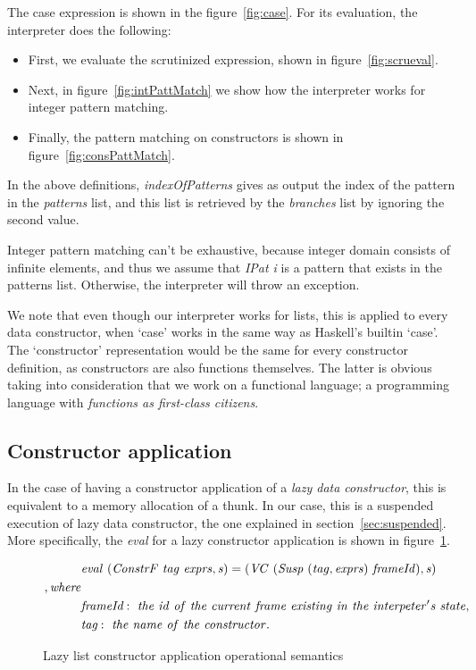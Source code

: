 \documentclass[diploma]{softlab-thesis}
\begin{document}
The case expression is shown in the figure~\ref{fig:case}. For its evaluation, the interpreter 
does the following:~
\begin{itemize}
  \item First, we evaluate the scrutinized expression, shown in figure~\ref{fig:scrueval}.
  \item Next, in figure~\ref{fig:intPattMatch} we show how the interpreter works for 
        integer pattern matching.
  \item Finally, the pattern matching on constructors is shown in figure~\ref{fig:consPattMatch}.
\end{itemize}


In the above definitions, \textit{indexOfPatterns} gives as output the index of the pattern 
in the \textit{patterns} list, and this list is retrieved by the \textit{branches} list 
by ignoring the second value.

Integer pattern matching can't be exhaustive, because integer domain consists of infinite elements, and thus we 
assume that \textit{IPat i} is a pattern that exists in the patterns list. Otherwise, the interpreter will throw an exception.


We note that even though our interpreter works for lists, this is applied to every data constructor, 
when `case' works in the same way as Haskell's builtin `case'. The `constructor' representation 
would be the same for every constructor definition, as constructors are also functions themselves. 
The latter is obvious taking into consideration that we work on a functional language; 
a programming language with \textit{functions as first-class citizens}.

\subsection{Constructor application}

In the case of having a constructor application of a \textit{lazy data constructor},
this is equivalent to a memory allocation of a thunk. In our case, this is 
a suspended execution of lazy data constructor, the one explained in section~\ref{sec:suspended}.
More specifically, the \textit{eval} for a lazy constructor application 
is shown in figure~\ref{fig:consAppl}.

\begin{figure}[h]
  \begin{align*}
    & \mathit{eval \hfill\ (ConstrF \hfill\ tag \hfill\ exprs, s) = (VC \hfill\ (Susp \hfill\ (tag, exprs) \hfill\ frameId), s)} \\
    \mathit{, where} \\
    &  \mathit{\textit{frameId}: \hfill\ the \hfill\ id \hfill\ of \hfill\ the 
    \hfill\ current \hfill\ frame \hfill\ existing \hfill\ in \hfill\ the \hfill\ interpeter's 
    \hfill\ state,} \\
    &  \mathit{\textit{tag}: \hfill\ the \hfill\ name \hfill\ of \hfill\ the \hfill\ 
    constructor.}
  \end{align*}
\caption{Lazy list constructor application operational semantics\label{fig:consAppl}}
\end{figure}
\end{document}
